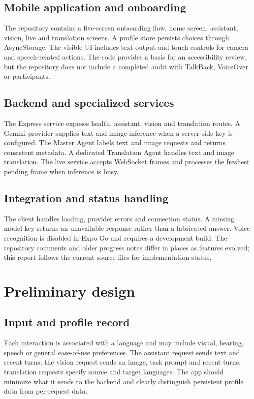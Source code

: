 \documentclass[12pt,a4paper,oneside]{report}
\begin{document}
\subsection{Mobile application and onboarding}
The repository contains a five-screen onboarding flow, home screen, assistant, vision, live and translation screens. A profile store persists choices through AsyncStorage. The visible UI includes text output and touch controls for camera and speech-related actions. The code provides a basis for an accessibility review, but the repository does not include a completed audit with TalkBack, VoiceOver or participants.

\subsection{Backend and specialized services}
The Express service exposes health, assistant, vision and translation routes. A Gemini provider supplies text and image inference when a server-side key is configured. The Master Agent labels text and image requests and returns consistent metadata. A dedicated Translation Agent handles text and image translation. The live service accepts WebSocket frames and processes the freshest pending frame when inference is busy.

\subsection{Integration and status handling}
The client handles loading, provider errors and connection status. A missing model key returns an unavailable response rather than a fabricated answer. Voice recognition is disabled in Expo Go and requires a development build. The repository comments and older progress notes differ in places as features evolved; this report follows the current source files for implementation status.

\section{Preliminary design}
\subsection{Input and profile record}
Each interaction is associated with a language and may include visual, hearing, speech or general ease-of-use preferences. The assistant request sends text and recent turns; the vision request sends an image, task prompt and recent turns; translation requests specify source and target languages. The app should minimize what it sends to the backend and clearly distinguish persistent profile data from per-request data.
\end{document}
